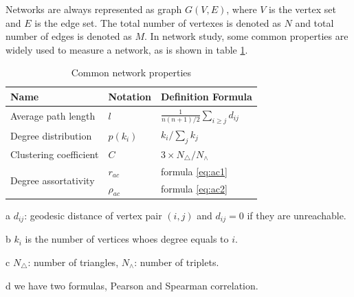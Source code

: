 \documentclass[symmetry,article,submit,moreauthors,pdftex,10pt,a4paper]{Definitions/mdpi}
\begin{document}
Networks are always represented as graph $G(V,E)$, where $V$ is the vertex set and $E$ is the edge set. The total number of vertexes is denoted as $N$ and total number of edges is denoted as $M$. In network study, some common properties are widely used to measure a network, as is shown in table \ref{tab:network-properties}.
%
\begin{table}[ht]
	\renewcommand{\arraystretch}{1.5}
	\centering
	\begin{threeparttable}
		\caption{Common network properties}
		\label{tab:network-properties}       %

		\begin{tabular*}{0.96\textwidth}{@{\extracolsep{\fill} }lll}
		\toprule
 		Name  &   Notation   &     Definition Formula  \\
		\midrule
		Average path length\tnote{a}      	& 	$l$		    & $\frac{1}{n(n+1)/2}\sum_{i\ge j}{d_{ij}}$\\
		Degree distribution\tnote{b}     	&   $p(k_i)$    & $k_i/\sum_{j}{k_j}$ \\
		Clustering coefficient\tnote{c}  	&   $C$       	& $3\times{N_\triangle}/N_\wedge$\\
		\multirow{2}{*}{Degree assortativity\tnote{d}}    	& $r_{ac}$  & formula \ref{eq:ac1} \\
															& $\rho_{ac}$ & formula \ref{eq:ac2}\\
		\bottomrule
		\end{tabular*}
	\end{threeparttable}
	
	\begin{tablenotes}[para]
		\item[a] $d_{ij}$: geodesic distance of vertex pair $(i, j)$ and $d_{ij}=0$ if they are unreachable.\\
		\item[b] $k_i$ is the number of vertices whoes degree equals to $i$.\\
		\item[c] $N_\triangle$: number of triangles, $N_\wedge$: number of triplets.\\
		\item[d] we have two formulas, Pearson and Spearman correlation.\\
	\end{tablenotes}
\end{table}
\end{document}
